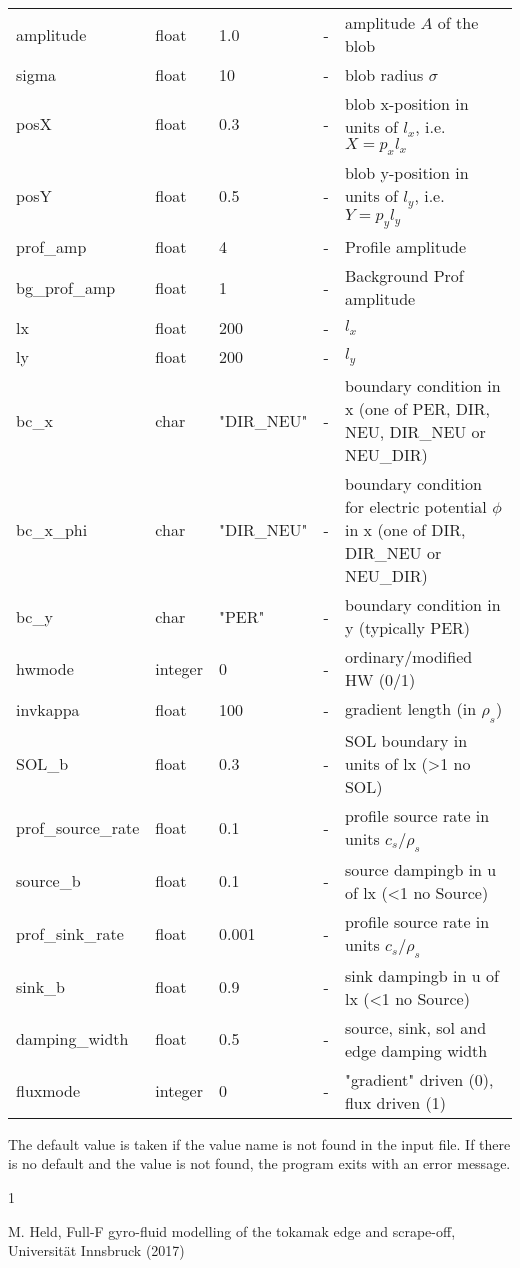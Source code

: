 \documentclass{hitec} %
\renewenvironment{thebibliography}[1]{
  \begin{oldthebibliography}{#1}
    \RaggedRight %
    \setlength{\itemsep}{0em}
    \setlength{\parskip}{0em}
}
{
  \end{oldthebibliography}
}
\begin{document}
\begin{longtable}{llll>{\RaggedRight}p{7cm}}
amplitude  & float &1.0    & - & amplitude $A$ of the blob \\
sigma      & float &10     & - & blob radius $\sigma$ \\
posX       & float &0.3    & - & blob x-position in units of $l_x$, i.e. $X = p_x l_x$\\
posY       & float &0.5    & - & blob y-position in units of $l_y$, i.e. $Y = p_y l_y$ \\
prof\_amp    & float &4   & - &Profile amplitude \\
bg\_prof\_amp& float &1   & - &Background Prof amplitude  \\
lx         & float &200    & - & $l_x$  \\
ly         & float &200    & - & $l_y$  \\
bc\_x       & char & "DIR\_NEU"  & - & boundary condition in x (one of PER, DIR, NEU, DIR\_NEU or NEU\_DIR) \\
bc\_x\_phi   & char & "DIR\_NEU" & - & boundary condition for electric potential $\phi$ in x (one of  DIR, DIR\_NEU or NEU\_DIR) \\
bc\_y       & char & "PER"      & - & boundary condition in y (typically PER) \\
hwmode                    & integer & 0    & - & ordinary/modified HW (0/1)\\
invkappa                  & float & 100    & - & gradient length (in $\rho_s$)  \\
SOL\_b                    & float & 0.3    & - & SOL boundary in units of lx (>1 no SOL) \\
prof\_source\_rate        & float & 0.1    & - & profile source rate in units $c_s/\rho_s$ \\
source\_b                 & float & 0.1    & - & source dampingb in u of lx (<1 no Source) \\
prof\_sink\_rate          & float & 0.001  & - & profile source rate in units $c_s/\rho_s$  \\
sink\_b                   & float & 0.9    & - & sink dampingb in u of lx (<1 no Source)   \\
damping\_width            & float & 0.5    & - & source, sink, sol and edge damping width \\
fluxmode                  & integer & 0    & - &"gradient" driven (0), flux driven (1)\\
\bottomrule
\end{longtable}

The default value is taken if the value name is not found in the input file. If there is no default and
the value is not found,
the program exits with an error message.
\begin{thebibliography}{1}
  M. Held, Full-F gyro-fluid modelling of the tokamak edge and scrape-off, Universit{\"a}t Innsbruck (2017)
\end{thebibliography}
\end{document}
